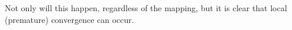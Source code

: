 \documentclass[twoside]{article}
\begin{document}
{Not only will this happen, regardless of the mapping, but it is clear that local (premature) convergence can occur.  %
%
%
%    
%    
}
\end{document}
